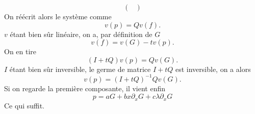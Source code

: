 \documentclass[memoire.tex]{subfiles}
\begin{document}
\begin{preuve}
\begin{equation*}
\begin{pmatrix}
        \end{pmatrix}
    \end{equation*}
    On réécrit alors le système comme
    \begin{equation*}
        v(p)= Qv(f).
    \end{equation*}
    $v$ étant bien sûr linéaire, on a, par définition de $G$
    \begin{equation*}
        v(f)=v(G)-tv(p).
    \end{equation*}
    On en tire 
    \begin{equation*}
        (I+t Q)v(p)= Qv(G).
    \end{equation*}
    $I$ étant bien sûr inversible, le germe de matrice $I+t Q$ est inversible, on a alors
    \begin{equation*}
        v(p)=(I+t Q)^{-1} Qv(G).
    \end{equation*}
    Si on regarde la première composante, il vient enfin
    \begin{equation*}
        p= aG +bx\partial_x G +c\lambda \partial_x G
    \end{equation*}
    Ce qui suffit.
\end{preuve}
\end{document}
